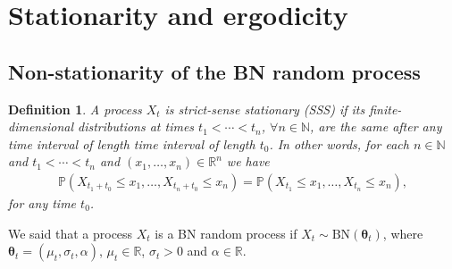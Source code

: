 \documentclass[12pt]{article}
\newtheorem{definition}[theorem]{Definition}
\theoremstyle{definition}
\begin{document}
\section{Stationarity and ergodicity}\label{sec:stat:ergo}

\subsection{Non-stationarity of the BN random process}

\begin{definition}
A process $X_t$ is strict-sense stationary (SSS) if its finite-dimensional distributions at times $t_1<\cdots<t_n$, $\forall n\in\mathbb{N}$, are the same after any
time interval of length time interval of length $t_0$. In other words, for each $n\in\mathbb{N}$ and $t_1<\cdots<t_n$ and $(x_1,\dots,x_n)\in\mathbb{R}^n$ we have
\begin{align*}%
\mathbb{P}(X_{t_1+t_0}\leq x_1,\dots,X_{t_n+t_0}\leq x_n)
=
\mathbb{P}(X_{t_1}\leq x_1,\dots,X_{t_n}\leq x_n),
\end{align*}
for any time $t_0$.
\end{definition}

We said that a process $X_t$ is a  BN random process if $X_t\sim \text{BN}(\boldsymbol{\theta}_t)$, where $\boldsymbol{\theta}_t=(\mu_t,\sigma_t,\alpha)$, $\mu_t\in\mathbb{R}$, $\sigma_t>0$ and $\alpha\in \mathbb{R}$. 
\end{document}
